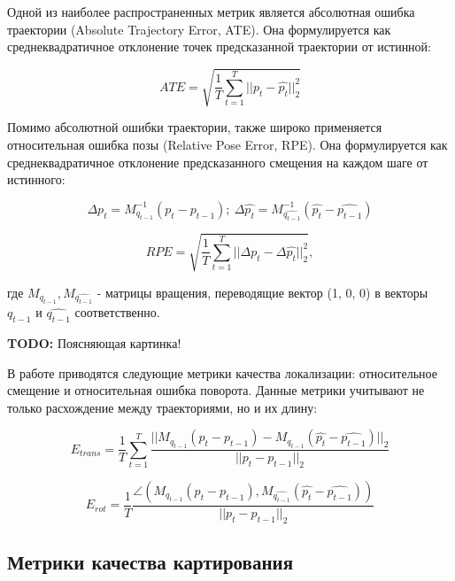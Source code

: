 \documentclass{mipt-thesis-ms}
\begin{document}
	Одной из наиболее распространенных метрик является абсолютная ошибка траектории (Absolute Trajectory Error, ATE). Она формулируется как среднеквадратичное отклонение точек предсказанной траектории от истинной:
	
	\begin{equation}
	\label{eq_ate}
	ATE = \sqrt{\frac{1}{T} \sum_{t=1}^T || p_t - \widehat{p_t} ||_2^2}
	\end{equation}
	
	Помимо абсолютной ошибки траектории, также широко применяется относительная ошибка позы (Relative Pose Error, RPE). Она формулируется как среднеквадратичное отклонение предсказанного смещения на каждом шаге от истинного:
	
	$$\Delta p_t = M_{q_{t-1}}^{-1} (p_t - p_{t-1});\ \Delta \widehat{p_t} = M_{\widehat{q_{t-1}}}^{-1} (\widehat{p_t} - \widehat{p_{t-1}})$$
	
	\begin{equation}
	\label{eq_rpe}
	RPE = \sqrt{\frac{1}{T} \sum_{t=1}^T ||\Delta p_t - \Delta \widehat{p_t} ||_2^2},
	\end{equation}
	
	где $M_{q_{t-1}}, M_{\widehat{q_{t-1}}}$ - матрицы вращения, переводящие вектор (1, 0, 0) в векторы $q_{t-1}$ и $\widehat{q_{t-1}}$ соответственно.
	
	\textbf{TODO:} Поясняющая картинка!
	
	В работе \cite{geiger2012we} приводятся следующие метрики качества локализации: относительное смещение и относительная ошибка поворота. Данные метрики учитывают не только расхождение между траекториями, но и их длину:
	
	\begin{equation}
	\label{eq_etrans}
	E_{trans} = \frac{1}{T} \sum\limits_{t=1}^T \frac{|| M_{q_{t-1}} (p_t - p_{t-1}) - M_{\widehat{q_{t-1}}} (\widehat{p_t} - \widehat{p_{t-1}}) ||_2}{|| p_t - p_{t-1} ||_2}
	\end{equation}
	
	\begin{equation}
	\label{eq_erot}
	E_{rot} = \frac{1}{T} \frac{\angle(M_{q_{t-1}} (p_t - p_{t-1}), M_{\widehat{q_{t-1}}} (\widehat{p_t} - \widehat{p_{t-1}}))}{|| p_t - p_{t-1} ||_2}
	\end{equation}
	
	\subsection{Метрики качества картирования}
	\label{section_our_ame}
	
\end{document}
